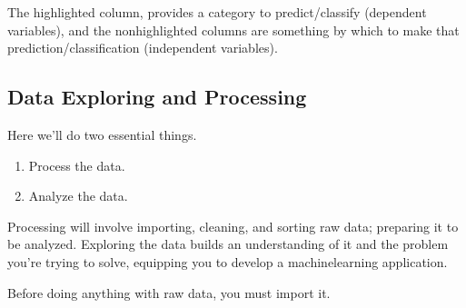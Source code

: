 \documentclass[letterpaper,10pt,english]{jupyterBook}
\begin{document}
\sphinxAtStartPar
The highlighted column,  provides a category to predict/classify (dependent variables), and the non\sphinxhyphen{}highlighted columns are something by which to make that prediction/classification (independent variables).

\sphinxstepscope


\subsection{Data Exploring and Processing}
\label{\detokenize{task2_c/example_sup_class/sup_class_ex-process:data-exploring-and-processing}}\label{\detokenize{task2_c/example_sup_class/sup_class_ex-process:sup-class-ex-data}}\label{\detokenize{task2_c/example_sup_class/sup_class_ex-process::doc}}
\sphinxAtStartPar
Here we’ll do two essential things.
\begin{enumerate}
%
\item {} 
\sphinxAtStartPar
Process the data.

\item {} 
\sphinxAtStartPar
Analyze the data.

\end{enumerate}

\sphinxAtStartPar
Processing will involve importing, cleaning, and sorting raw data; preparing it to be analyzed. Exploring the data builds an understanding of it and the problem you’re trying to solve, equipping you to develop a machine\sphinxhyphen{}learning application.

\sphinxAtStartPar
Before doing anything with raw data, you must import it.
\end{document}
